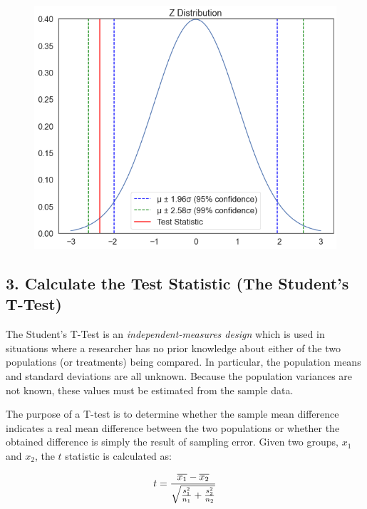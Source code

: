 \documentclass[
  letterpaper,
  DIV=11,
  numbers=noendperiod]{scrreprt}
\begin{document}
\begin{figure}[H]

{\centering \includegraphics{notebooks/W07. Distributions and Basic Statistics_files/figure-pdf/cell-36-output-1.png}

}

\end{figure}

\hypertarget{calculate-the-test-statistic-the-students-t-test}{%
\subsection{3. Calculate the Test Statistic (The Student's
T-Test)}\label{calculate-the-test-statistic-the-students-t-test}}

The Student's T-Test is an \emph{independent-measures design} which is
used in situations where a researcher has no prior knowledge about
either of the two populations (or treatments) being compared. In
particular, the population means and standard deviations are all
unknown. Because the population variances are not known, these values
must be estimated from the sample data.

The purpose of a T-test is to determine whether the sample mean
difference indicates a real mean difference between the two populations
or whether the obtained difference is simply the result of sampling
error. Given two groups, \(x_1\) and \(x_2\), the \(t\) statistic is
calculated as:

\[ \Huge t = {\frac{\overline{x_1}-\overline{x_2}} {\sqrt{\frac{s^2_1}{n_1} + \frac{s^2_2}{n_2}}}} \]
\end{document}
